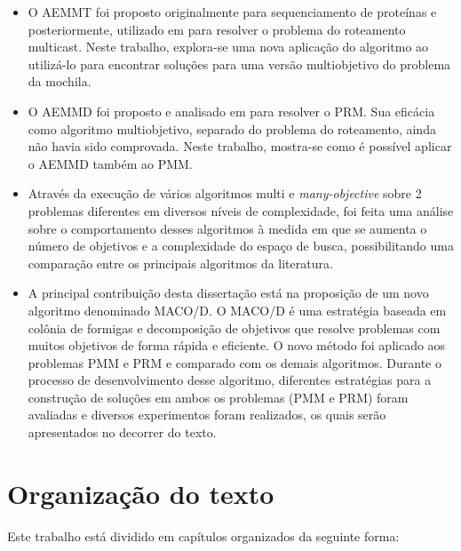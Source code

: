 \begin{itemize}  
	\item O \ac{AEMMT} foi proposto originalmente para sequenciamento de proteínas \cite{Brasil2013} e posteriormente, utilizado em  \cite{Lafeta2016} para resolver o problema do roteamento multicast. Neste trabalho, explora-se uma nova aplicação do algoritmo ao utilizá-lo para encontrar soluções para uma versão multiobjetivo do problema da mochila.
	\item O \ac{AEMMD} foi proposto e analisado em \cite{Lafeta2016} para resolver o \ac{PRM}. Sua eficácia como algoritmo multiobjetivo, separado do problema do roteamento, ainda não havia sido comprovada. Neste trabalho, mostra-se como é possível aplicar o \ac{AEMMD} também ao \ac{PMM}.
	\item Através da execução de vários algoritmos multi e \textit{many-objective} sobre 2 problemas diferentes em diversos níveis de complexidade, foi feita uma análise sobre o comportamento desses algoritmos à medida em que se aumenta o número de objetivos e a complexidade do espaço de busca, possibilitando uma comparação entre os principais algoritmos da literatura.
	\item A principal contribuição desta dissertação está na proposição de um novo algoritmo denominado \ac{MACO/D}. O \ac{MACO/D} é uma estratégia baseada em colônia de formigas e decomposição de objetivos que resolve problemas com muitos objetivos de forma rápida e eficiente. O novo método foi aplicado aos problemas \ac{PMM} e \ac{PRM} e comparado com os demais algoritmos. Durante o processo de desenvolvimento desse algoritmo, diferentes estratégias para a construção de soluções em ambos os problemas (PMM e PRM) foram avaliadas e diversos experimentos foram realizados, os quais serão apresentados no decorrer do texto.
\end{itemize}

\section{Organização do texto}
Este trabalho está dividido em capítulos organizados da seguinte forma:

